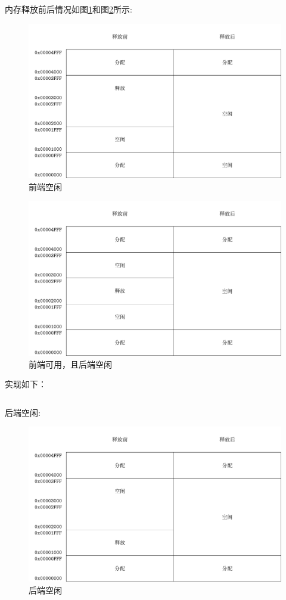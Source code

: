 内存释放前后情况如图\ref{fig:mem0}和图\ref{fig:mem1}所示: 

\begin{figure}[h]
  \centering
  \includegraphics[width=.8\textwidth]{fig/mem0.pdf}
  \caption{前端空闲}
  \label{fig:mem0}
\end{figure}

\begin{figure}[h]
  \centering
  \includegraphics[width=.8\textwidth]{fig/mem1.pdf}
  \caption{前端可用，且后端空闲}
  \label{fig:mem1}
\end{figure}

\newpage
实现如下：

\begin{listing}[H]
  \inputminted[tabsize=2, firstline=98, lastline=116,
  linenos=true]{c}{../ZOS/src/kernel/memory.c}
\end{listing}

\newpage
后端空闲:

\begin{figure}[h]
  \centering
  \includegraphics[width=.8\textwidth]{fig/mem2.pdf}
  \caption{后端空闲}
  \label{fig:mem3}
\end{figure}

